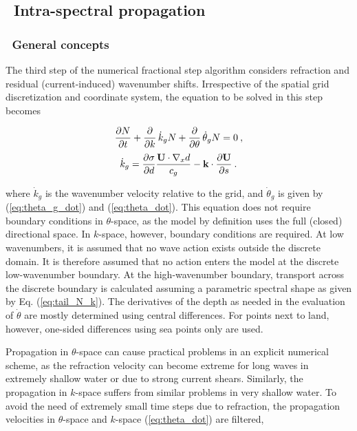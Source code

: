 \vssub
\subsection{~Intra-spectral propagation} \label{sub:spec}
\vssub
\subsubsection{~General concepts}
\vsssub

The third step of the numerical fractional step algorithm considers refraction
and residual (current-induced) wavenumber shifts. Irrespective of the spatial
grid discretization and coordinate system, the equation to be solved in this
step becomes


\begin{equation}
\frac{\partial N}{\partial t} + \frac{\partial}{\partial k} \, \dot{k}_g N +
\frac{\partial}{\partial \theta} \, \dot{\theta}_g N = 0
\: , \label{eq:step_intra} \end{equation} \begin{equation}
\dot{k}_g  = \frac{\partial \sigma}{\partial d} 
    \frac{{\bf U} \cdot \nabla_x d}{c_g}  -
    {\bf k} \cdot \frac{\partial {\bf U}}{\partial s}
\: . \label{eq:k_dot_g} \end{equation}

\noindent
where $\dot{k}_g$ is the wavenumber velocity relative to the grid, and
$\dot{\theta}_g$ is given by (\ref{eq:theta_g_dot}) and (\ref{eq:theta_dot}).
This equation does not require boundary conditions in $\theta$-space, as the
model by definition uses the full (closed) directional space. In $k$-space,
however, boundary conditions are required. At low wavenumbers, it is assumed
that no wave action exists outside the discrete domain. It is therefore
assumed that no action enters the model at the discrete low-wavenumber
boundary. At the high-wavenumber boundary, transport across the discrete
boundary is calculated assuming a parametric spectral shape as given by
Eq. (\ref{eq:tail_N_k}). The derivatives of the depth as needed in the
evaluation of $\dot{\theta}$ are mostly determined using central
differences. For points next to land, however, one-sided differences using sea
points only are used.

Propagation in $\theta$-space can cause practical problems in an explicit
numerical scheme, as the refraction velocity can become extreme for long waves
in extremely shallow water or due to strong current shears. Similarly, 
the propagation in $k$-space suffers from similar problems in very shallow water. 
To avoid the need of extremely small time steps
due to refraction, the propagation velocities in $\theta$-space and $k$-space
(\ref{eq:theta_dot}) are filtered,

